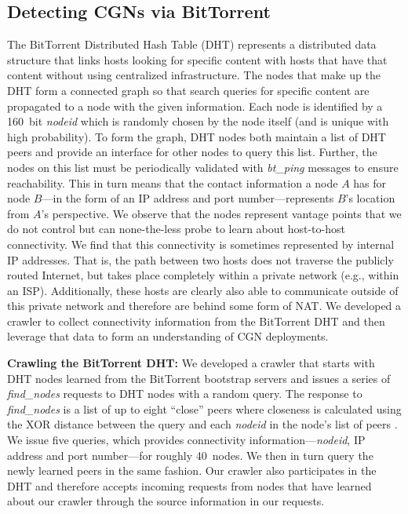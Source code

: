 \documentclass[10pt]{sig-alternate-05-2015}
\newcommand{\parax}[1]{\vspace{0.2em} \noindent \textbf{#1:}}
\newcommand{\btping}{\textit{bt\_ping}\xspace}
\newcommand{\btfindnodes}{\textit{find\_nodes}\xspace}
\newcommand{\btnodeid}{\textit{nodeid}\xspace}
\begin{document}
\subsection{Detecting CGNs via BitTorrent}
\label{sec:cgndetection:bt}

The BitTorrent Distributed Hash Table (DHT) \cite{bittorrent_dht}
represents a distributed data structure that links hosts looking for
specific content with hosts that have that content without using
centralized infrastructure.  The nodes that make up the DHT form a
connected graph so that search queries for specific content are
propagated to a node with the given information.  Each node is
identified by a 160~bit \btnodeid which is randomly chosen by the
node itself (and is unique with high probability).  To form the
graph, DHT nodes both maintain a list of DHT peers and provide an
interface for other nodes to query this list.  Further, the nodes on
this list must be periodically validated with \btping messages to
ensure reachability.  This in turn means that the contact
information a node $A$ has for node $B$---in the form of an IP
address and port number---represents $B$'s location from $A$'s
perspective.  We observe that the nodes represent vantage points
that we do not control but can none-the-less probe to learn about
host-to-host connectivity.  We find that this connectivity is
sometimes represented by internal IP addresses.  That is, the path
between two hosts does not traverse the publicly routed Internet,
but takes place completely within a private network (e.g., within an
ISP).  Additionally, these hosts are clearly also able to
communicate outside of this private network and therefore are behind
some form of NAT.  We developed a crawler to collect connectivity
information from the BitTorrent DHT and then leverage that data to
form an understanding of CGN deployments.

\parax{Crawling the BitTorrent DHT}
We developed a crawler that starts with DHT nodes learned from the
BitTorrent bootstrap servers and issues a series of \btfindnodes
requests to DHT nodes with a random query.  The response to
\btfindnodes is a list of up to eight ``close'' peers where
closeness is calculated using the XOR distance between the query and
each \btnodeid in the node's list of peers
\cite{maymounkov2002kademlia}.  We issue five queries, which provides
connectivity information---\btnodeid, IP address and port
number---for roughly 40~nodes.  We then in turn query the newly
learned peers in the same fashion.  Our crawler also participates in
the DHT and therefore accepts incoming requests from nodes that have
learned about our crawler through the source information in our
requests.
\end{document}
